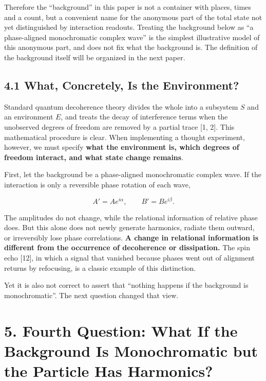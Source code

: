 \documentclass[
  a4paper,
]{article}
\begin{document}
Therefore the ``background'' in this paper is not a container with
places, times and a count, but a convenient name for the anonymous part
of the total state not yet distinguished by interaction readouts.
Treating the background below as ``a phase-aligned monochromatic complex
wave'' is the simplest illustrative model of this anonymous part, and
does not fix what the background is. The definition of the background
itself will be organized in the next paper.

\subsection{4.1 What, Concretely, Is the
Environment?}\label{what-concretely-is-the-environment}

Standard quantum decoherence theory divides the whole into a subsystem
\(S\) and an environment \(E\), and treats the decay of interference
terms when the unobserved degrees of freedom are removed by a partial
trace {[}1, 2{]}. This mathematical procedure is clear. When
implementing a thought experiment, however, we must specify \textbf{what
the environment is, which degrees of freedom interact, and what state
change remains}.

First, let the background be a phase-aligned monochromatic complex wave.
If the interaction is only a reversible phase rotation of each wave,

\[
A'=Ae^{i\alpha},\qquad B'=Be^{i\beta}.
\]

The amplitudes do not change, while the relational information of
relative phase does. But this alone does not newly generate harmonics,
radiate them outward, or irreversibly lose phase correlations. \textbf{A
change in relational information is different from the occurrence of
decoherence or dissipation.} The spin echo {[}12{]}, in which a signal
that vanished because phases went out of alignment returns by
refocusing, is a classic example of this distinction.

Yet it is also not correct to assert that ``nothing happens if the
background is monochromatic''. The next question changed that view.

\section{5. Fourth Question: What If the Background Is Monochromatic but
the Particle Has
Harmonics?}\label{fourth-question-what-if-the-background-is-monochromatic-but-the-particle-has-harmonics}
\end{document}
